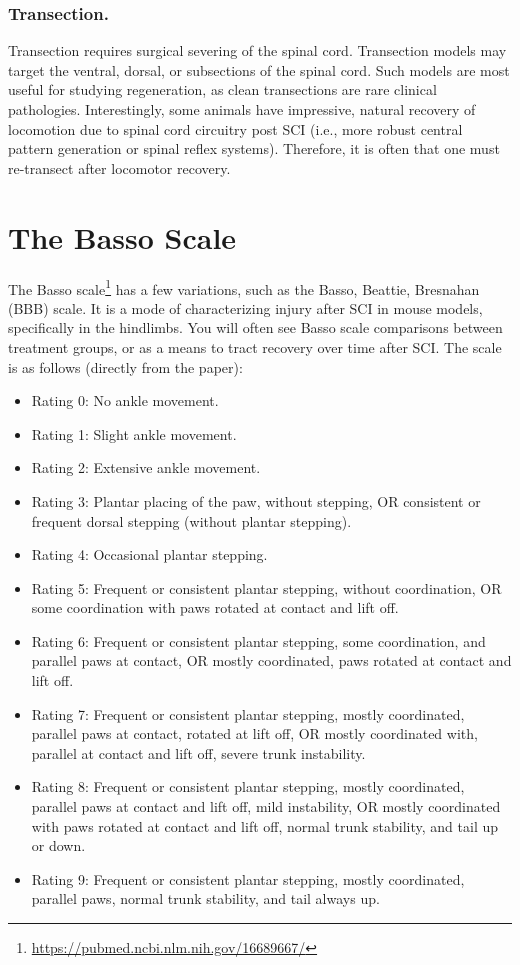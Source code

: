 \documentclass[12pt]{report}
\begin{document}
\subsubsection{Transection.}
Transection requires surgical severing of the spinal cord. Transection models may target the ventral, dorsal, or subsections of the spinal cord. Such models are most useful for studying regeneration, as clean transections are rare clinical pathologies. Interestingly, some animals have impressive, natural recovery of locomotion due to spinal cord circuitry post SCI (i.e., more robust central pattern generation or spinal reflex systems). Therefore, it is often that one must re-transect after locomotor recovery. 

\section{The Basso Scale}

The Basso scale\footnote{\url{https://pubmed.ncbi.nlm.nih.gov/16689667/}} has a few variations, such as the Basso, Beattie, Bresnahan (BBB) scale. It is a mode of characterizing injury after SCI in mouse models, specifically in the hindlimbs. You will often see Basso scale comparisons between treatment groups, or as a means to tract recovery over time after SCI. The scale is as follows (directly from the paper): 

\begin{itemize}
    \item Rating 0: No ankle movement.
    \item Rating 1: Slight ankle movement. 
    \item Rating 2: Extensive ankle movement. 
    \item Rating 3: Plantar placing of the paw, without stepping, OR consistent or frequent dorsal stepping (without plantar stepping). 
    \item Rating 4: Occasional plantar stepping. 
    \item Rating 5: Frequent or consistent plantar stepping, without coordination, OR some coordination with paws rotated at contact and lift off. 
    \item Rating 6: Frequent or consistent plantar stepping, some coordination, and parallel paws at contact, OR mostly coordinated, paws rotated at contact and lift off. 
    \item Rating 7: Frequent or consistent plantar stepping, mostly coordinated, parallel paws at contact, rotated at lift off, OR mostly coordinated with, parallel at contact and lift off, severe trunk instability. 
    \item Rating 8: Frequent or consistent plantar stepping, mostly coordinated, parallel paws at contact and lift off, mild instability, OR mostly coordinated with paws rotated at contact and lift off, normal trunk stability, and tail up or down. 
    \item Rating 9: Frequent or consistent plantar stepping, mostly coordinated, parallel paws, normal trunk stability, and tail always up. 
\end{itemize}
\end{document}
